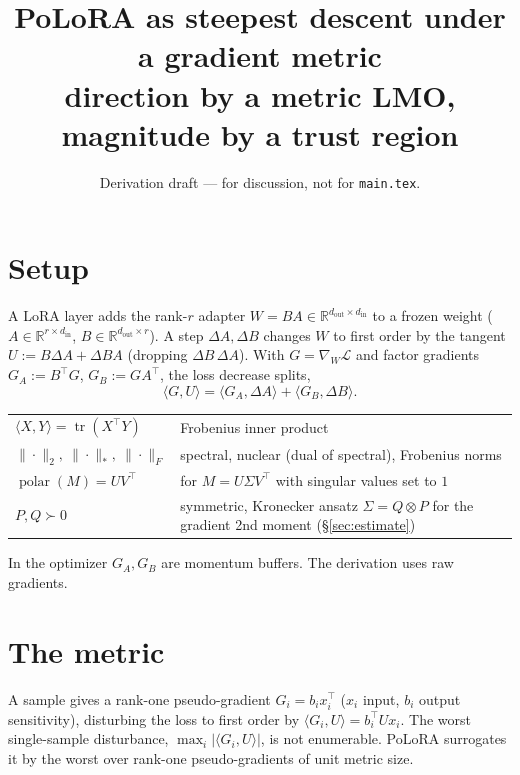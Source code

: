 \documentclass[11pt]{article}
\title{PoLoRA as steepest descent under a gradient metric\\[2pt]
\large direction by a metric LMO, magnitude by a trust region}
\author{}
\date{Derivation draft --- for discussion, not for \texttt{main.tex}.}
\DeclarePairedDelimiter{\norm}{\lVert}{\rVert}
\newcommand{\polar}{\operatorname{polar}}
\newcommand{\R}{\mathbb{R}}
\DeclareMathOperator{\tr}{tr}
\newcommand{\norm}[1]{\| #1\|}
\begin{document}
\maketitle

\section{Setup}
\label{sec:setup}

A LoRA layer adds the rank-$r$ adapter
$W=BA\in\R^{d_{\mathrm{out}}\times d_{\mathrm{in}}}$ to a frozen weight
($A\in\R^{r\times d_{\mathrm{in}}}$, $B\in\R^{d_{\mathrm{out}}\times r}$). A step
$\Delta A,\Delta B$ changes $W$ to first order by the tangent
$U:=B\Delta A+\Delta B A$ (dropping $\Delta B\,\Delta A$). With
$G=\nabla_W\mathcal L$ and factor gradients $G_A:=B^\top G$, $G_B:=GA^\top$, the
loss decrease splits,
\begin{equation}
  \langle G,U\rangle=\langle G_A,\Delta A\rangle+\langle G_B,\Delta B\rangle.
  \label{eq:split}
\end{equation}

\begin{center}
\begin{tabular}{@{}ll@{}}
$\langle X,Y\rangle=\tr(X^\top Y)$ & Frobenius inner product\\
$\norm{\cdot}_2,\ \norm{\cdot}_*,\ \norm{\cdot}_F$ & spectral, nuclear (dual of spectral), Frobenius norms\\
$\polar(M)=UV^\top$ & for $M=U\Sigma V^\top$ with singular values set to $1$\\
$P,Q\succ0$ & symmetric, Kronecker ansatz $\Sigma=Q\otimes P$ for the gradient 2nd moment (\S\ref{sec:estimate})\\
\end{tabular}
\end{center}

\noindent In the optimizer $G_A,G_B$ are momentum buffers. The derivation uses
raw gradients.

\section{The metric}
\label{sec:metric}

A sample gives a rank-one pseudo-gradient $G_i=b_ix_i^\top$ ($x_i$ input, $b_i$
output sensitivity), disturbing the loss to first order by
$\langle G_i,U\rangle=b_i^\top Ux_i$. The worst single-sample disturbance,
$\max_i|\langle G_i,U\rangle|$, is not enumerable. PoLoRA surrogates it by the
worst over rank-one pseudo-gradients of unit metric size.
\end{document}
